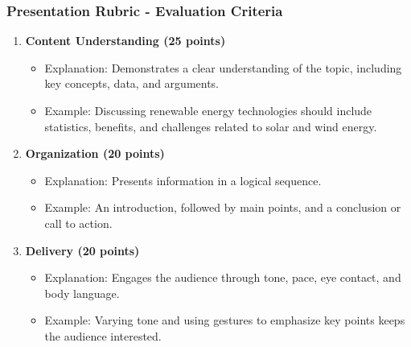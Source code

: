 \documentclass[aspectratio=169]{beamer}
\begin{document}
\begin{frame}[fragile]
    \frametitle{Presentation Rubric - Evaluation Criteria}
    \begin{enumerate}
        \item \textbf{Content Understanding (25 points)}
            \begin{itemize}
                \item Explanation: Demonstrates a clear understanding of the topic, including key concepts, data, and arguments.
                \item Example: Discussing renewable energy technologies should include statistics, benefits, and challenges related to solar and wind energy.
            \end{itemize}
        
        \item \textbf{Organization (20 points)}
            \begin{itemize}
                \item Explanation: Presents information in a logical sequence.
                \item Example: An introduction, followed by main points, and a conclusion or call to action. 
            \end{itemize}
        
        \item \textbf{Delivery (20 points)}
            \begin{itemize}
                \item Explanation: Engages the audience through tone, pace, eye contact, and body language.
                \item Example: Varying tone and using gestures to emphasize key points keeps the audience interested.
            \end{itemize}
    \end{enumerate}
\end{frame}
\end{document}
